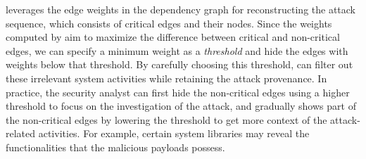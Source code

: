 \tool leverages the edge weights in the dependency graph for reconstructing the attack sequence, which consists of critical edges and their nodes.
Since the weights computed by \tool aim to maximize the difference between critical and non-critical edges, we can specify a minimum weight as a \emph{threshold} and hide the edges with weights below that threshold.
By carefully choosing this threshold, \tool can filter out these irrelevant system activities while retaining the attack provenance.
%
In practice, the security analyst can first hide the non-critical edges using a higher threshold to focus on the investigation of the attack, and gradually shows part of the non-critical edges by lowering the threshold to get more context of the attack-related activities.
For example, certain system libraries may reveal the functionalities that the malicious payloads possess.  





